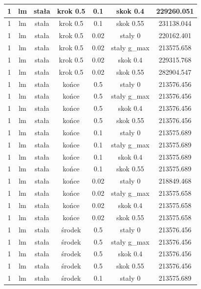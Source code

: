 \documentclass[11pt]{article}
\begin{document}
\begin{table}[h]
\begin{center}
\begin{tabular}{|c|c|c|c|c|c|c|}
      \hline
      1 & lm & stała & krok 0.5 & 0.1 & skok 0.4 & 229260.051 \\
      \hline
      1 & lm & stała & krok 0.5 & 0.1 & skok 0.55 & 231138.044 \\
      \hline
      1 & lm & stała & krok 0.5 & 0.02 & stały 0 & 220162.401 \\
      \hline
      1 & lm & stała & krok 0.5 & 0.02 & stały g_max & 213575.658 \\
      \hline
      1 & lm & stała & krok 0.5 & 0.02 & skok 0.4 & 229315.768 \\
      \hline
      1 & lm & stała & krok 0.5 & 0.02 & skok 0.55 & 282904.547 \\
      \hline
      1 & lm & stała & końce & 0.5 & stały 0 & 213576.456 \\
      \hline
      1 & lm & stała & końce & 0.5 & stały g_max & 213576.456 \\
      \hline
      1 & lm & stała & końce & 0.5 & skok 0.4 & 213576.456 \\
      \hline
      1 & lm & stała & końce & 0.5 & skok 0.55 & 213576.456 \\
      \hline
      1 & lm & stała & końce & 0.1 & stały 0 & 213575.689 \\
      \hline
      1 & lm & stała & końce & 0.1 & stały g_max & 213575.689 \\
      \hline
      1 & lm & stała & końce & 0.1 & skok 0.4 & 213575.689 \\
      \hline
      1 & lm & stała & końce & 0.1 & skok 0.55 & 213575.689 \\
      \hline
      1 & lm & stała & końce & 0.02 & stały 0 & 218849.468 \\
      \hline
      1 & lm & stała & końce & 0.02 & stały g_max & 213575.658 \\
      \hline
      1 & lm & stała & końce & 0.02 & skok 0.4 & 213575.658 \\
      \hline
      1 & lm & stała & końce & 0.02 & skok 0.55 & 213575.658 \\
      \hline
      1 & lm & stała & środek & 0.5 & stały 0 & 213576.456 \\
      \hline
      1 & lm & stała & środek & 0.5 & stały g_max & 213576.456 \\
      \hline
      1 & lm & stała & środek & 0.5 & skok 0.4 & 213576.456 \\
      \hline
      1 & lm & stała & środek & 0.5 & skok 0.55 & 213576.456 \\
      \hline
      1 & lm & stała & środek & 0.1 & stały 0 & 213575.689 \\

\end{tabular}
\end{center}
\end{table}
\end{document}
